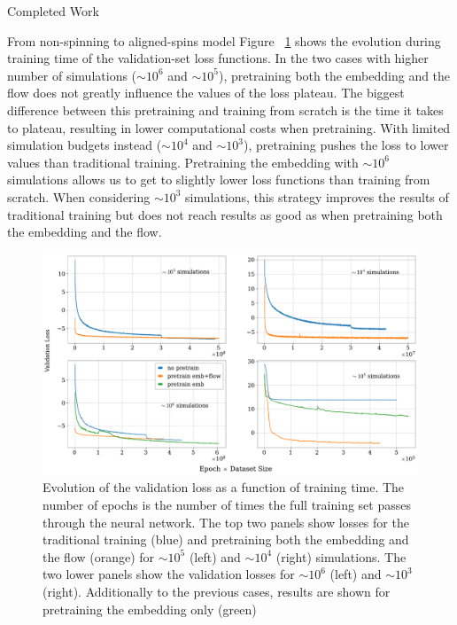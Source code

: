 \documentclass[a4paper, 12pt, twoside, openright, titlepage]{book}
\begin{document}
\begin{chapter}{Completed Work}
\begin{section}{From non-spinning to aligned-spins model}
Figure ~\ref{loss} shows the evolution during training time of the validation-set loss functions.
In the two cases with higher number of simulations ($\sim 10^{6}$ and $\sim 10^{5}$), pretraining both the embedding and the flow does not greatly influence the values of the loss plateau. The biggest difference between this pretraining and training from scratch is the time it takes to plateau, resulting in lower computational costs when pretraining.
With limited simulation budgets instead ($\sim 10^{4}$ and $\sim 10^{3}$), pretraining pushes the loss to lower values than traditional training.
Pretraining the embedding with $\sim10^{6}$ simulations allows us to get to slightly lower loss functions than training from scratch.
When considering $\sim10^{3}$ simulations, this strategy improves the results of traditional training but does not reach results as good as when pretraining both the embedding and the flow.



\begin{figure}
\includegraphics[width=1.\columnwidth]{figures/val_loss.pdf}
\caption{Evolution of the validation loss as a function of training time. The number of epochs is the number of times the full training set passes through the neural network. The top two panels show losses for the traditional training (blue) and pretraining both the embedding and the flow (orange) for $\sim10^{5}$ (left) and $\sim10^{4}$ (right) simulations. The two lower panels show the validation losses for  $\sim10^{6}$ (left) and $\sim10^{3}$ (right). Additionally to the previous cases, results are shown for pretraining the embedding only (green)}
\label{loss}
\end{figure}


\end{section}
\end{chapter}
\end{document}
